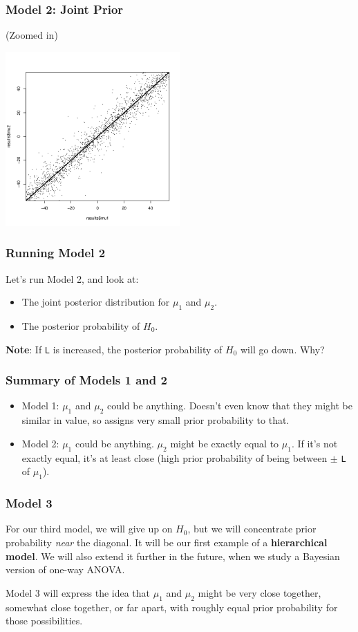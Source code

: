 \documentclass{beamer}
\begin{document}
\begin{frame}[fragile]
\frametitle{Model 2: Joint Prior}
(Zoomed in)
\begin{center}
\includegraphics[width=0.5\textwidth]{images/ttest_prior2.png}
\end{center}

\end{frame}


\begin{frame}[fragile]
\frametitle{Running Model 2}
Let's run Model 2, and look at:\pause

\begin{itemize}
\item The joint posterior distribution for $\mu_1$ and $\mu_2$.\pause
\item The posterior probability of $H_0$.\pause
\end{itemize}

{\bf Note}: If \texttt{L} is increased, the posterior probability of
$H_0$ will go down. Why?
\end{frame}


\begin{frame}[fragile]
\frametitle{Summary of Models 1 and 2}
\begin{itemize}
\item Model 1: $\mu_1$ and $\mu_2$ could be anything. Doesn't even know that
they might be similar in value, so assigns very small prior probability to that.\pause
\item Model 2: $\mu_1$ could be anything. $\mu_2$ might be exactly equal to
$\mu_1$. If it's not exactly equal, it's at least close (high prior probability
of being between $\pm$ \texttt{L} of $\mu_1$). 
\end{itemize}


\end{frame}


\begin{frame}
\frametitle{Model 3}
For our third model, we will give up on $H_0$, but we will concentrate
prior probability {\em near} the diagonal. It will be our first example of
a {\bf hierarchical model}. We will also extend it further in the future,
when we study a Bayesian version of one-way ANOVA.\\[0.5em]\pause

Model 3 will express the idea that $\mu_1$ and $\mu_2$ might be very close
together, somewhat close together, or far apart, with roughly equal prior
probability for those possibilities.
\end{frame}
\end{document}
